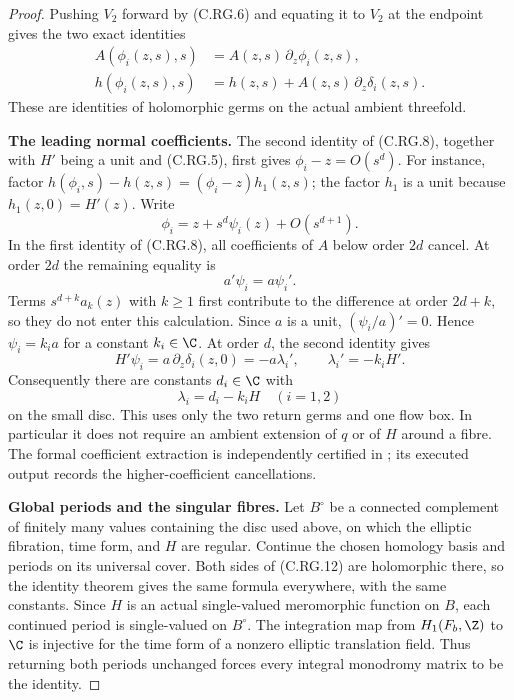 \begin{proof}
Pushing $V_2$ forward by (C.RG.6) and equating it to
$V_2$ at the endpoint gives the two exact identities
\[
 \begin{split}
 A(\phi_i(z,s),s)&=A(z,s)\,\partial_z\phi_i(z,s),\\
 h(\phi_i(z,s),s)&=h(z,s)+A(z,s)\,\partial_z\delta_i(z,s).
 \end{split}                                                   \tag{C.RG.8}
\]
These are identities of holomorphic germs on the actual
ambient threefold.

\par\medskip\noindent\textbf{The leading normal coefficients.}
The second identity of (C.RG.8), together with $H'$ being
a unit and (C.RG.5), first gives
$\phi_i-z=O(s^d)$. For instance, factor
$h(\phi_i,s)-h(z,s)=(\phi_i-z)h_1(z,s)$;
the factor $h_1$ is a unit because $h_1(z,0)=H'(z)$.
Write
\[
                \phi_i=z+s^d\psi_i(z)+O(s^{d+1}).
                                                               \tag{C.RG.9}
\]
In the first identity of (C.RG.8), all coefficients
of $A$ below order $2d$ cancel. At order $2d$ the
remaining equality is
\[
                         a'\psi_i=a\psi_i'.
                                                               \tag{C.RG.10}
\]
Terms $s^{d+k}a_k(z)$ with $k\ge1$ first contribute
to the difference at order $2d+k$, so they do not
enter this calculation. Since $a$ is a unit,
$(\psi_i/a)'=0$. Hence $\psi_i=k_i a$ for a constant
$k_i\in\C$. At order $d$, the second identity gives
\[
 H'\psi_i=a\,\partial_z\delta_i(z,0)
          =-a\lambda_i',\qquad
             \lambda_i'= -k_i H'.
                                                               \tag{C.RG.11}
\]
Consequently there are constants $d_i\in\C$ with
\[
                         \lambda_i=d_i-k_iH
                    \quad(i=1,2)
                                                               \tag{C.RG.12}
\]
on the small disc. This uses only the two return germs
and one flow box. In particular it does not require
an ambient extension of $q$ or of $H$ around a fibre.
The formal coefficient extraction is independently
certified in ; its executed
output records the higher-coefficient cancellations.

\par\medskip\noindent\textbf{Global periods and the singular fibres.}
Let $B^\circ$ be a connected complement of finitely
many values containing the disc used above, on which
the elliptic fibration, time form, and $H$ are regular.
Continue the chosen homology basis and periods on its
universal cover. Both sides of (C.RG.12) are holomorphic
there, so the identity theorem gives the same formula
everywhere, with the same constants. Since $H$ is an
actual single-valued meromorphic function on $B$, each
continued period is single-valued on $B^\circ$.
The integration map from $H_1(F_b,\Z)$ to $\C$ is
injective for the time form of a nonzero elliptic
translation field. Thus returning both periods
unchanged forces every integral monodromy matrix to
be the identity.


\end{proof}
